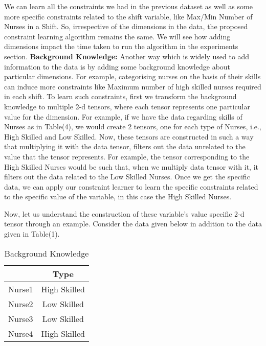 \documentclass{article}
\begin{document}
We can learn all the constraints we had in the previous dataset as well as some more specific constraints related to the shift variable, like Max/Min Number of Nurses in a Shift. So, irrespective of the dimensions in the data, the proposed constraint learning algorithm remains the same. We will see how adding dimensions impact the time taken to run the algorithm in the experiments section.
\newline
\newline
\textbf{Background Knowledge: } Another way which is widely used to add information to the data is by adding some background knowledge about particular dimensions. For example, categorising nurses on the basis of their skills can induce more constraints like Maximum number of high skilled nurses required in each shift. To learn such constraints, first we transform the background knowledge to multiple 2-d tensors, where each tensor represents one particular value for the dimension. For example, if we have the data regarding skills of Nurses as in Table(4), we would create 2 tensors, one for each type of Nurses, i.e., High Skilled and Low Skilled. Now, these tensors are constructed in such a way that multiplying it with the data tensor, filters out the data unrelated to the value that the tensor represents. For example, the tensor corresponding to the High Skilled Nurses would be such that, when we multiply data tensor with it, it filters out the data related to the Low Skilled Nurses. Once we get the specific data, we can apply our constraint learner to learn the specific constraints related to the specific value of the variable, in this case the High Skilled Nurses.

Now, let us understand the construction of these variable's value specific 2-d tensor through an example. Consider the data given below in addition to the data given in Table(1).

\begin{table}[H]
\caption{Background Knowledge}
\begin{center}
\begin{tabular}{c|c|}
\cline{2-2}
\multicolumn{1}{l|}{}        & Type  \\ \hline
\multicolumn{1}{|c|}{Nurse1} & High Skilled   \\ \hline
\multicolumn{1}{|c|}{Nurse2} & Low Skilled    \\ \hline
\multicolumn{1}{|c|}{Nurse3} & Low Skilled    \\ \hline
\multicolumn{1}{|c|}{Nurse4} & High Skilled    \\ \hline
\end{tabular}
\end{center}
\end{table}
\end{document}
